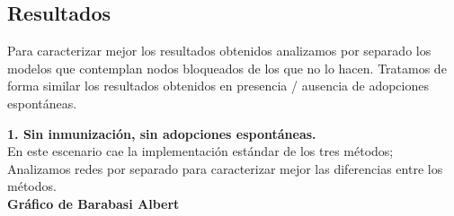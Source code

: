\documentclass{article}
\begin{document}
\subsection{Resultados}
Para caracterizar mejor los resultados obtenidos analizamos por separado los modelos que contemplan nodos bloqueados de los que no lo hacen. Tratamos de forma similar los resultados obtenidos en presencia / ausencia de adopciones espontáneas.

\textbf{1. Sin inmunización, sin adopciones espontáneas.}\\
En este escenario cae la implementación estándar de los tres métodos; Analizamos redes por separado para caracterizar mejor las diferencias entre los métodos.\\



\textbf{Gráfico de Barabasi Albert}
\end{document}

